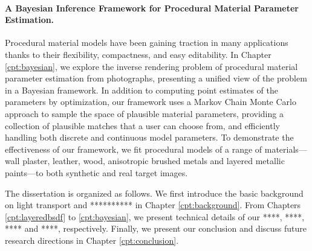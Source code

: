 \paragraph{A Bayesian Inference Framework for Procedural Material Parameter Estimation.}
Procedural material models have been gaining traction in many applications thanks to their flexibility, compactness, and easy editability.
In Chapter \ref{cpt:bayesian}, we explore the inverse rendering problem of procedural material parameter estimation from photographs, presenting a unified view of the problem in a Bayesian framework. In addition to computing point estimates of the parameters by optimization, our framework uses a Markov Chain Monte Carlo approach to sample the space of plausible material parameters, providing a collection of plausible matches that a user can choose from, and efficiently handling both discrete and continuous model parameters. To demonstrate the effectiveness of our framework, we fit procedural models of a range of materials---wall plaster, leather, wood, anisotropic brushed metals and layered metallic paints---to both synthetic and real target images.

The dissertation is organized as follows. We first introduce the basic background on light transport and ********** in Chapter \ref{cpt:background}. From Chapters \ref{cpt:layeredbsdf} to \ref{cpt:bayesian}, we present technical details of our ****, ****, **** and ****, respectively. Finally, we present our conclusion and discuss future research directions in Chapter \ref{cpt:conclusion}.